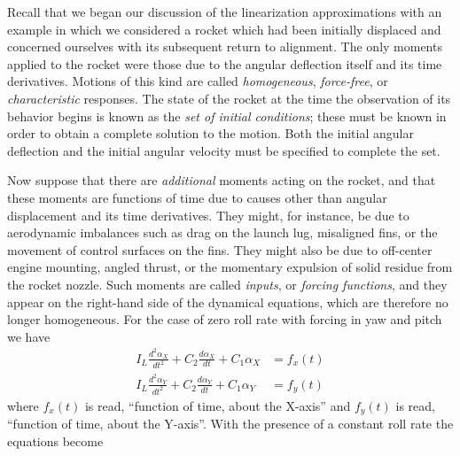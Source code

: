 Recall that we began our discussion of the linearization approximations with
an example in which we considered a rocket which had been initially displaced
and concerned ourselves with its subsequent return to alignment. The only
moments applied to the rocket were those due to the angular deflection itself
and its time derivatives. Motions of this kind are called \emph{homogeneous},
\emph{force-free}, or \emph{characteristic} responses. The state of the rocket
at the time the observation of its behavior begins is known as the \emph{set
of initial conditions}; these must be known in order to obtain a complete
solution to the motion. Both the initial angular deflection and the initial
angular velocity must be specified to complete the set.

Now suppose that there are \emph{additional} moments acting on the rocket, and
that these moments are functions of time due to causes other than angular
displacement and its time derivatives. They might, for instance, be due to
aerodynamic imbalances such as drag on the launch lug, misaligned fins, or the
movement of control surfaces on the fins. They might also be due to off-center
engine mounting, angled thrust, or the momentary expulsion of solid residue
from the rocket nozzle. Such moments are called \emph{inputs}, or
\emph{forcing functions}, and they appear on the right-hand side of the
dynamical equations, which are therefore no longer homogeneous. For the case
of zero roll rate with forcing in yaw and pitch we have
\begin{equation}\label{ch2:eq:13}
\begin{aligned}
I_L \frac{d^{2}\alpha_X}{dt^{2}} + C_2 \frac{d\alpha_X}{dt} + C_1\alpha_X &= f_x(t)\\
I_L \frac{d^{2}\alpha_Y}{dt^{2}} + C_2 \frac{d\alpha_Y}{dt} + C_1\alpha_Y &= f_y(t)
\end{aligned}
\end{equation}
where $f_x(t)$ is read, ``function of time, about the X-axis'' and $f_y(t)$ is
read, ``function of time, about the Y-axis''. With
the presence of a constant roll rate the equations become

